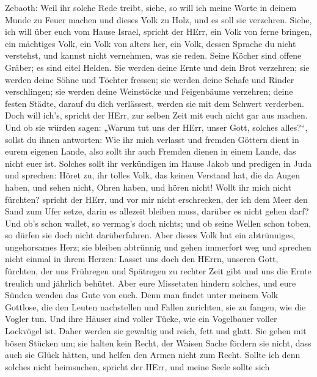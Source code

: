 Zebaoth: Weil ihr solche Rede treibt, siehe, so will ich meine Worte in
deinem Munde zu Feuer machen und dieses Volk zu Holz, und es soll sie
verzehren.  Siehe, ich will über euch vom Hause Israel,
spricht der HErr, ein Volk von ferne bringen, ein mächtiges Volk, ein
Volk von alters her, ein Volk, dessen Sprache du nicht verstehst, und
kannst nicht vernehmen, was sie reden.  Seine Köcher sind
offene Gräber; es sind eitel Helden.  Sie werden deine
Ernte und dein Brot verzehren; sie werden deine Söhne und Töchter
fressen; sie werden deine Schafe und Rinder verschlingen; sie werden
deine Weinstöcke und Feigenbäume verzehren; deine festen Städte, darauf
du dich verlässest, werden sie mit dem Schwert verderben. 
Doch will ich's, spricht der HErr, zur selben Zeit mit euch nicht gar
aus machen.  Und ob sie würden sagen: „Warum tut uns der
HErr, unser Gott, solches alles?{}``, sollst du ihnen antworten: Wie ihr
mich verlasst und fremden Göttern dient in eurem eigenen Lande, also
sollt ihr auch Fremden dienen in einem Lande, das nicht euer ist.
 Solches sollt ihr verkündigen im Hause Jakob und predigen
in Juda und sprechen:  Höret zu, ihr tolles Volk, das
keinen Verstand hat, die da Augen haben, und sehen nicht, Ohren haben,
und hören nicht!  Wollt ihr mich nicht fürchten? spricht
der HErr, und vor mir nicht erschrecken, der ich dem Meer den Sand zum
Ufer setze, darin es allezeit bleiben muss, darüber es nicht gehen darf?
Und ob's schon wallet, so vermag's doch nichts; und ob seine Wellen
schon toben, so dürfen sie doch nicht darüberfahren.  Aber
dieses Volk hat ein abtrünniges, ungehorsames Herz; sie bleiben
abtrünnig und gehen immerfort weg  und sprechen nicht
einmal in ihrem Herzen: Lasset uns doch den HErrn, unseren Gott,
fürchten, der uns Frühregen und Spätregen zu rechter Zeit gibt und uns
die Ernte treulich und jährlich behütet.  Aber eure
Missetaten hindern solches, und eure Sünden wenden das Gute von euch.
 Denn man findet unter meinem Volk Gottlose, die den Leuten
nachstellen und Fallen zurichten, sie zu fangen, wie die Vogler tun.
 Und ihre Häuser sind voller Tücke, wie ein Vogelbauer
voller Lockvögel ist. Daher werden sie gewaltig und reich, fett und
glatt.  Sie gehen mit bösen Stücken um; sie halten kein
Recht, der Waisen Sache fördern sie nicht, dass auch sie Glück hätten,
und helfen den Armen nicht zum Recht.  Sollte ich denn
solches nicht heimsuchen, spricht der HErr, und meine Seele sollte sich
